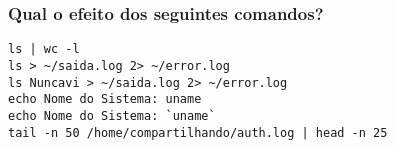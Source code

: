 \documentclass{beamer}
\begin{document}
   \begin{frame}[fragile]
      \frametitle{Qual o efeito dos seguintes comandos?}
      \begin{verbatim}
ls | wc -l 
ls > ~/saida.log 2> ~/error.log 
ls Nuncavi > ~/saida.log 2> ~/error.log
echo Nome do Sistema: uname  
echo Nome do Sistema: `uname`
tail -n 50 /home/compartilhando/auth.log | head -n 25  
       \end{verbatim}
\end{frame}


\end{document}
